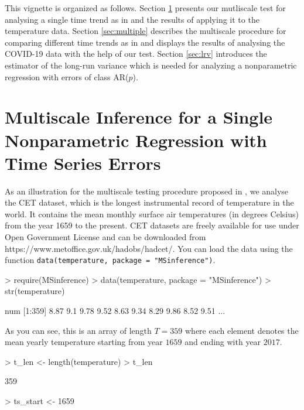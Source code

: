 \documentclass[a4paper]{scrartcl}
\begin{document}
This vignette is organized as follows. Section \ref{sec:single} presents our mutliscale test for analysing a single time trend as in\cite{KhismatullinaVogt2020} and the results of applying it to the temperature data. Section \ref{sec:multiple} describes the multiscale procedure for comparing different time trends as in \cite{KhismatullinaVogt2023} and displays the results of analysing the COVID-19 data with the help of our test. Section \ref{sec:lrv} introduces the estimator of the long-run variance which is needed for analyzing a nonparametric regression with errors of class AR($p$). %

\begin{Schunk}
\end{Schunk}

\section{Multiscale Inference for a Single Nonparametric Regression with Time Series Errors}\label{sec:single}

As an illustration for the multiscale testing procedure proposed in \cite{KhismatullinaVogt2020}, we analyse the CET dataset, which is the longest instrumental record of temperature in the world. It contains the mean monthly surface air temperatures (in degrees Celsius) from the year 1659 to the present. CET datasets are freely available for use under Open Government License and can be downloaded from https://www.metoffice.gov.uk/hadobs/hadcet/. You can load the data using the function \verb|data(temperature, package = "MSinference")|.

\begin{Schunk}
\begin{Sinput}
> require(MSinference)
> data(temperature, package = "MSinference")
> str(temperature)
\end{Sinput}
\begin{Soutput}
 num [1:359] 8.87 9.1 9.78 9.52 8.63 9.34 8.29 9.86 8.52 9.51 ...
\end{Soutput}
\end{Schunk}

As you can see, this is an array of length $T = 359$ where each element denotes the mean yearly temperature starting from year $1659$ and ending with year $2017$.

\begin{Schunk}
\begin{Sinput}
> t_len    <- length(temperature)
> t_len
\end{Sinput}
\begin{Soutput}
[1] 359
\end{Soutput}
\begin{Sinput}
> ts_start <- 1659
\end{Sinput}
\end{Schunk}
\end{document}
